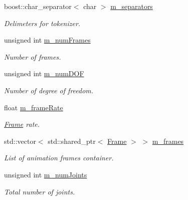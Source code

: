\begin{DoxyCompactItemize}
\item 
boost\+::char\+\_\+separator$<$ char $>$ \hyperlink{class_motion_a634c3ff073eed0a22423b2068b4054dc}{m\+\_\+separators}\hypertarget{class_motion_a634c3ff073eed0a22423b2068b4054dc}{}\label{class_motion_a634c3ff073eed0a22423b2068b4054dc}

\begin{DoxyCompactList}\small\item\em Delimeters for tokenizer. \end{DoxyCompactList}\item 
unsigned int \hyperlink{class_motion_a3bbd62529e65c7e1cdf0b11ce5ddd83e}{m\+\_\+num\+Frames}\hypertarget{class_motion_a3bbd62529e65c7e1cdf0b11ce5ddd83e}{}\label{class_motion_a3bbd62529e65c7e1cdf0b11ce5ddd83e}

\begin{DoxyCompactList}\small\item\em Number of frames. \end{DoxyCompactList}\item 
unsigned int \hyperlink{class_motion_ad16a2c807c942da7663a6791ad33fd52}{m\+\_\+num\+D\+OF}\hypertarget{class_motion_ad16a2c807c942da7663a6791ad33fd52}{}\label{class_motion_ad16a2c807c942da7663a6791ad33fd52}

\begin{DoxyCompactList}\small\item\em Number of degree of freedom. \end{DoxyCompactList}\item 
float \hyperlink{class_motion_a90d1f96d5075f86d06533a1cc7ee9c0f}{m\+\_\+frame\+Rate}\hypertarget{class_motion_a90d1f96d5075f86d06533a1cc7ee9c0f}{}\label{class_motion_a90d1f96d5075f86d06533a1cc7ee9c0f}

\begin{DoxyCompactList}\small\item\em \hyperlink{class_frame}{Frame} rate. \end{DoxyCompactList}\item 
std\+::vector$<$ std\+::shared\+\_\+ptr$<$ \hyperlink{class_frame}{Frame} $>$ $>$ \hyperlink{class_motion_aeb77f9ca3a537bfb94d6036b221dab73}{m\+\_\+frames}\hypertarget{class_motion_aeb77f9ca3a537bfb94d6036b221dab73}{}\label{class_motion_aeb77f9ca3a537bfb94d6036b221dab73}

\begin{DoxyCompactList}\small\item\em List of animation frames container. \end{DoxyCompactList}\item 
unsigned int \hyperlink{class_motion_af838f86e18d4b63bf86b79141090f639}{m\+\_\+num\+Joints}\hypertarget{class_motion_af838f86e18d4b63bf86b79141090f639}{}\label{class_motion_af838f86e18d4b63bf86b79141090f639}

\begin{DoxyCompactList}\small\item\em Total number of joints. \end{DoxyCompactList}\end{DoxyCompactItemize}


